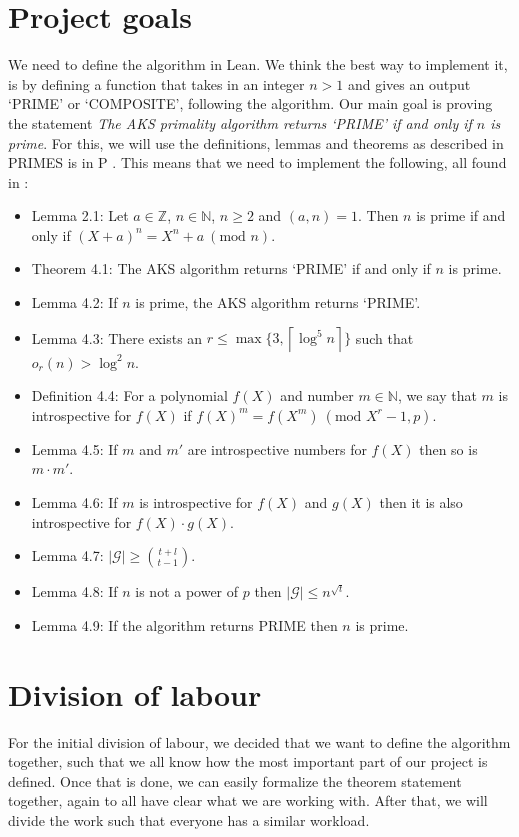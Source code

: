 \documentclass[10pt,a4paper]{article}
\newcommand{\0}{\textbf{0}}
\newcommand{\N}{\mathbb{N}}
\newcommand{\Z}{\mathbb{Z}}
\begin{document}
	\section*{Project goals}
	We need to define the algorithm in Lean. We think the best way to implement it, is by defining a function that takes in an integer $n>1$ and gives an output `PRIME' or `COMPOSITE', following the algorithm.
	Our main goal is proving the statement \textit{The AKS primality algorithm returns `PRIME' if and only if $n$ is prime}.
	For this, we will use the definitions, lemmas and theorems as described in PRIMES is in P \cite{PRIMES in P}. This means that we need to implement the following, all found in \cite{PRIMES in P}:
	\begin{itemize}
		\item Lemma 2.1: Let $a\in\Z$, $n\in\N$, $n\geq2$ and $(a,n)=1$. Then $n$ is prime if and only if $(X+a)^n=X^n+a \ (\text{mod } n)$.
		\item Theorem 4.1: The AKS algorithm returns `PRIME' if and only if $n$ is prime.
		\item Lemma 4.2: If $n$ is prime, the AKS algorithm returns `PRIME'.
		\item Lemma 4.3: There exists an $r\leq \max\{3,\left\lceil \log^5n\right\rceil\}$ such that $o_r(n)>\log^2n$.
		\item Definition 4.4: For a polynomial $f(X)$ and number $m\in\N$, we say that $m$ is introspective for $f(X)$ if $f(X)^m=f(X^m)\ (\text{mod } X^r-1,p)$.
		\item Lemma 4.5: If $m$ and $m′$ are introspective numbers for $f (X)$ then so is $m \cdot m′$.
		\item Lemma 4.6: If $m$ is introspective for $f(X)$ and $g(X)$ then it is also introspective for $f (X) \cdot g(X)$.
		\item Lemma 4.7: $|\mathcal{G}| \ge {t+l \choose t-1} $.
		\item Lemma 4.8: If $n$ is not a power of $p$ then $|\mathcal{G}|\le n^{\sqrt t}$.
		\item Lemma 4.9: If the algorithm returns PRIME then $n$ is prime.
	\end{itemize}
	
	\section*{Division of labour}
	For the initial division of labour, we decided that we want to define the algorithm together, such that we all know how the most important part of our project is defined.
	Once that is done, we can easily formalize the theorem statement together, again to all have clear what we are working with.
	After that, we will divide the work such that everyone has a similar workload.
	
\end{document}
